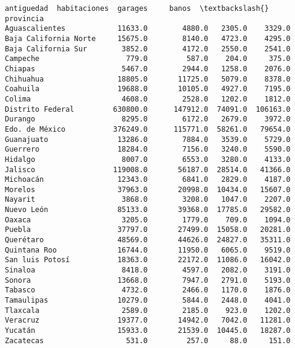\documentclass[11pt]{article}
\newcommand{\prompt}[4]{
        \llap{{\color{#2}[#3]: #4}}\vspace{-1.25em}
    }
\begin{document}
            \begin{tcolorbox}[breakable, boxrule=.5pt, size=fbox, pad at break*=1mm, opacityfill=0]
\prompt{Out}{outcolor}{8}{\hspace{3.5pt}}
\begin{Verbatim}[commandchars=\\\{\}]
                       antiguedad  habitaciones  garages     banos  \textbackslash{}
provincia
Aguascalientes            11633.0        4880.0   2305.0    3329.0
Baja California Norte     15675.0        8140.0   4723.0    4295.0
Baja California Sur        3852.0        4172.0   2550.0    2541.0
Campeche                    779.0         587.0    204.0     375.0
Chiapas                    5467.0        2944.0   1258.0    2076.0
Chihuahua                 18805.0       11725.0   5079.0    8378.0
Coahuila                  19688.0       10105.0   4927.0    7195.0
Colima                     4608.0        2528.0   1202.0    1812.0
Distrito Federal         630800.0      147912.0  74091.0  106163.0
Durango                    8295.0        6172.0   2679.0    3972.0
Edo. de México           376249.0      115771.0  58261.0   79654.0
Guanajuato                13286.0        7884.0   3539.0    5729.0
Guerrero                  18284.0        7156.0   3240.0    5590.0
Hidalgo                    8007.0        6553.0   3280.0    4133.0
Jalisco                  119008.0       56187.0  28514.0   41366.0
Michoacán                 12343.0        6841.0   2829.0    4187.0
Morelos                   37963.0       20998.0  10434.0   15607.0
Nayarit                    3868.0        3208.0   1047.0    2207.0
Nuevo León                85133.0       39368.0  17785.0   29582.0
Oaxaca                     3205.0        1779.0    709.0    1094.0
Puebla                    37797.0       27499.0  15058.0   20281.0
Querétaro                 48569.0       44626.0  24827.0   35311.0
Quintana Roo              16744.0       11950.0   6065.0    9519.0
San luis Potosí           18363.0       22172.0  11086.0   16042.0
Sinaloa                    8418.0        4597.0   2082.0    3191.0
Sonora                    13668.0        7947.0   2791.0    5193.0
Tabasco                    4732.0        2466.0   1170.0    1876.0
Tamaulipas                10279.0        5844.0   2448.0    4041.0
Tlaxcala                   2589.0        2185.0    923.0    1202.0
Veracruz                  19377.0       14942.0   7042.0   11281.0
Yucatán                   15933.0       21539.0  10445.0   18287.0
Zacatecas                   531.0         257.0     88.0     151.0


\end{Verbatim}
\end{tcolorbox}
\end{document}
